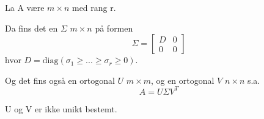 La A være $m\times n$ med rang r.

Da fins det en $\Sigma$ $m\times n$ på formen
$$\Sigma = \begin{bmatrix} D & 0 \\ 0 & 0 \end{bmatrix}$$
hvor $D = \text{diag}(\sigma_1 \geq ... \geq \sigma_r \geq 0)$.

Og det fins også en ortogonal $U$ $m\times m$,
og en ortogonal $V$ $n\times n$ s.a.
$$A = U\Sigma V^T$$

U og V er ikke unikt bestemt.
